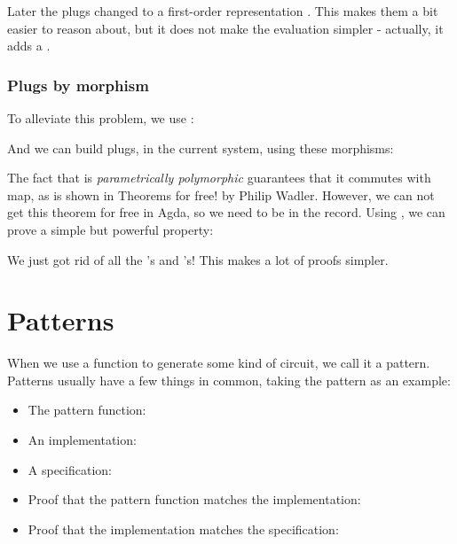 Later the plugs changed to a first-order representation 
\AY{(} \AY{)} .
This makes them a bit easier to reason about, but it does not make the
evaluation simpler - actually, it adds a .

\subsubsection{Plugs by morphism}\label{plugs-by-morphism}

To alleviate this problem, we use :


And we can build plugs, in the current system, using these morphisms:


The fact that  is \emph{parametrically polymorphic} guarantees
that it commutes with map, as is shown in Theorems for free! by Philip
Wadler.
However, we can not get this theorem for free in Agda, so we need
 to be in the record.
Using , we can prove a simple but powerful
property:


We just got rid of all the 's and 's! This
makes a lot of proofs simpler.

\section{Patterns}\label{patterns}

When we use a function to generate some kind of circuit, we call it a
pattern.
Patterns usually have a few things in common, taking the 
pattern as an example:

\begin{itemize}
\item
  The pattern function: 
\item
  An implementation: 
\item
  A specification: 
\item
  Proof that the pattern function matches the implementation:
\item
  Proof that the implementation matches the specification:
\end{itemize}


